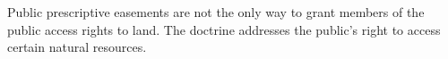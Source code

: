Public prescriptive easements are not the only way to grant members of the
public access rights to land. The  doctrine addresses the
public's right to access certain natural resources.

